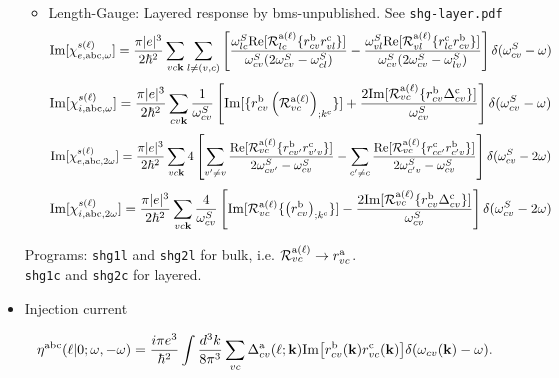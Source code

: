 \documentclass[openany,oneside]{book}
\numberwithin{equation}{section}
\begin{document}
\begin{itemize}
\begin{itemize}
\item Length-Gauge: 
Layered response by bms-unpublished. See \verb=shg-layer.pdf=
\begin{equation*}\label{imchiewn}
\mathrm{Im}[\chi_{e,\mathrm{a}\mathrm{b}\mathrm{c},\omega}^{s(\ell)}]
=
\frac{\pi |e|^3}{2\hbar^2} 
\sum_{vc\mathbf{k}}
\sum_{l\neq(v,c)}
\left[
\frac{\omega^S_{lc}\mathrm{Re}[{\cal R}^{\mathrm{a}(\ell)}_{lc}\{r^{\mathrm{b}}_{cv}r^{\mathrm{c}}_{vl}\}]}
{\omega^S_{cv}(2\omega^S_{cv}-\omega^S_{cl})}
-
\frac{\omega^S_{vl}\mathrm{Re}[{\cal R}^{\mathrm{a}(\ell)}_{vl}\{r^{\mathrm{c}}_{lc}r^{\mathrm{b}}_{cv}\}]}
{\omega^S_{cv}(2\omega^S_{cv}-\omega^S_{lv})}
\right]
\delta(\omega^S_{cv}-\omega)
\end{equation*}  
\begin{equation*}\label{imchiwn}
\mathrm{Im}[\chi_{i,\mathrm{a}\mathrm{b}\mathrm{c},\omega}^{s(\ell)}]
=
\frac{\pi|e|^3}{2\hbar^2}
\sum_{cv\mathbf{k}}
\frac{1}{\omega^S_{cv}}
\left[
\mathrm{Im}[\{r^{\mathrm{b}}_{cv}\left({\cal R}^{\mathrm{a}(\ell)}_{vc}\right)_{;k^{\mathrm{c}}}\}]
+
\frac{2\mathrm{Im}[{\cal R}^{\mathrm{a}(\ell)}_{vc}\{r^{\mathrm{b}}_{cv}\Delta^{\mathrm{c}}_{cv}\}]}{\omega^S_{cv}}
\right]
\delta(\omega^S_{cv}-\omega)
\end{equation*}
\begin{equation*}\label{imchie2wn}
\mathrm{Im}[\chi_{e,\mathrm{a}\mathrm{b}\mathrm{c},2\omega}^{s(\ell)}]
=
\frac{\pi |e|^3}{2\hbar^2} 
\sum_{vc\mathbf{k}}
4
\left[
\sum_{v'\ne v}
\frac{\mathrm{Re}[{\cal
    R}^{\mathrm{a}(\ell)}_{vc}\{r^{\mathrm{b}}_{cv'}r^{\mathrm{c}}_{v'v}\}]}{2\omega^S_{cv'}-\omega^S_{cv}}
-
\sum_{c'\ne c}
\frac{\mathrm{Re}[{\cal R}^{\mathrm{a}(\ell)}_{vc}\{r^{\mathrm{c}}_{cc'}r^{\mathrm{b}}_{c'v}\}]}
{2\omega^S_{c'v}-\omega^S_{cv}}
\right]
\delta(\omega^S_{cv}-2\omega)
\end{equation*}
\begin{equation*}\label{imchi2wn}
\mathrm{Im}[\chi_{i,\mathrm{a}\mathrm{b}\mathrm{c},2\omega}^{s(\ell)}]
=
\frac{\pi|e|^3}{2\hbar^2}\sum_{vc\mathbf{k}}
\frac{4}{\omega^S_{cv}}
\left[
\mathrm{Im}[{\cal R}^{\mathrm{a}(\ell)}_{vc}\{\left(r^{\mathrm{b}}_{cv}\right)_{;k^{\mathrm{c}}}\}]
-
\frac{2\mathrm{Im}[{\cal R}^{\mathrm{a}(\ell)}_{vc}\{r^{\mathrm{b}}_{cv}\Delta^{\mathrm{c}}_{cv}\}]}{\omega^S_{cv}}
\right]\delta(\omega^S_{cv}-2\omega)
\end{equation*}
\end{itemize}
Programs: \verb=shg1l= and \verb=shg2l= for bulk, i.e. ${\cal
  R}^{\mathrm{a}(\ell)}_{vc}\to r^{\mathrm{a}}_{vc}$.\\
\verb=shg1c= and \verb=shg2c= for layered.

\item Injection current

\begin{equation*}\label{zetaell}
\eta^{\mathrm{a}\mathrm{b}\mathrm{c}}(\ell|0;\omega,-\omega)
=
\frac{i\pi e^3}{\hbar^2}
\int\frac{d^3k}{8\pi^3}
\sum_{vc}
\Delta_{cv}^{\mathrm{a}}(\ell;\mathbf{k})
\mathrm{Im}
\big[ 
r^{\mathrm{b}}_{cv}(\mathbf{k}) 
r^{\mathrm{c}}_{vc}(\mathbf{k})
\big]
\delta(\omega_{cv}(\mathbf{k})-\omega)
.\nonumber
\end{equation*} 


\end{itemize}
\end{document}
